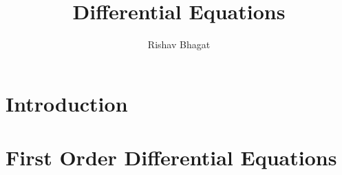 \title{Differential Equations}

\author{Rishav Bhagat}

\maketitle
\chapter{Introduction}
    
    
    
\chapter{First Order Differential Equations}
    
    
    
    
    \graphicspath{{../chapter_2/section_2.5/}}
    
    
    \graphicspath{{../chapter_2/section_2.7/}}
    
    \graphicspath{{../chapter_2/section_2.8/}}
    
    \graphicspath{{../chapter_2/section_2.9/}}
    